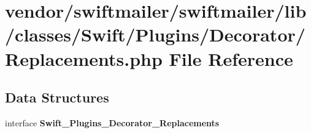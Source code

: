\section{vendor/swiftmailer/swiftmailer/lib/classes/\+Swift/\+Plugins/\+Decorator/\+Replacements.php File Reference}
\label{_replacements_8php}
\subsection*{Data Structures}
\begin{DoxyCompactItemize}
\item 
interface {\bf Swift\+\_\+\+Plugins\+\_\+\+Decorator\+\_\+\+Replacements}
\end{DoxyCompactItemize}
